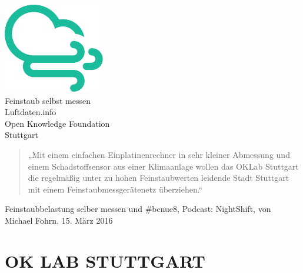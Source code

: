\documentclass[
notumble,
]{leaflet}
\begin{document}
\color{LDGREEN}
\begin{center}
\includegraphics[width=\textwidth]{images/logo_luftdaten_info}
\\[2em]
\sffamily
\huge
Feinstaub selbst messen
\\[1em]
Luftdaten.info
\\[1em]
Open Knowledge Foundation 
\\
Stuttgart
\normalsize 
\normalfont
\end{center}
\color{black}

\newpage


\begin{quote}
„Mit einem einfachen Einplatinenrechner in sehr kleiner Abmessung und einem Schadstoffsensor aus einer Klimaanlage wollen das OKLab Stuttgart die regelmäßig unter zu hohen Feinstaubwerten leidende Stadt Stuttgart mit einem Feinstaubmessgerätenetz überziehen.“
\end{quote}
\raggedright{Feinstaubbelastung selber messen und \#bcnue8, Podcast: NightShift, von Michael Fohrn, 15. März 2016}


\section{OK LAB STUTTGART}
\end{document}
